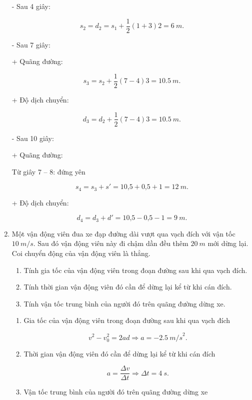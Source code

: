 \begin{enumerate}[label=\bfseries Câu \arabic*:]
{\begin{enumerate}[label=\alph*)]
			- Sau 4 giây:
			
			$$s_2 = d_2 = s_1 + \dfrac{1}{2} (1+3)2 = \SI{6}{m}.$$
			
			- Sau 7 giây:
			
			+ Quãng đường:
			
			$$s_3 = s_2 + \dfrac{1}{2} (7-4)3 = \SI{10,5}{m}.$$
			
			+ Độ dịch chuyển:
			
			$$d_3 = d_2 + \dfrac{1}{2} (7-4)3 = \SI{10,5}{m}.$$
			
			- Sau 10 giây:
			
			+ Quãng đường:
			
			 Từ giây 7 – 8: đứng yên
		
			$$s_4 = s_3 + s' = \text{10,5} + \text{0,5} + 1 = \SI{12}{m}.$$
			
			+ Độ dịch chuyển:
			
			$$d_4 = d_3 + d' = \text{10,5} - \text{0,5} - 1 = \SI{9}{m}.$$
			
		\end{enumerate}
	}
	\item {}

	
	{Một vận động viên đua xe đạp đường dài vượt qua vạch đích với vận tốc $\SI{10}{m/s}$. Sau đó vận động viên này đi chậm dần đều thêm $\SI{20}{m}$ mới dừng lại. Coi chuyển động của vận động viên là thẳng.
		\begin{enumerate}[label=\alph*)]
			\item Tính gia tốc của vận động viên trong đoạn đường sau khi qua vạch đích.
			\item Tính thời gian vận động viên đó cần để dừng lại kể từ khi cán đích.
			\item Tính vận tốc trung bình của người đó trên quãng đường dừng xe.
		\end{enumerate}
	}

	\hideall
	{	
		\begin{enumerate}[label=\alph*)]
			\item Gia tốc của vận động viên trong đoạn đường sau khi qua vạch đích
			
			$$v^2 - v_0^2 = 2ad \Rightarrow a = -\SI{2,5}{m/s}^2.$$
			
			\item Thời gian vận động viên đó cần để dừng lại kể từ khi cán đích
			
			$$a = \dfrac{\Delta v}{\Delta t} \Rightarrow  \Delta t = \SI{4}{s}.$$
			 
			\item Vận tốc trung bình của người đó trên quãng đường dừng xe
			

\end{enumerate}}
\end{enumerate}
